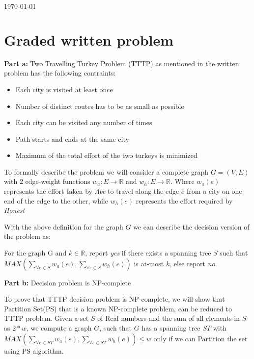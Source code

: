 \documentclass[8pt]{article}
\begin{document}
\hfill \small{\today} \\
\setlength{\fboxrule}{.5mm}\setlength{\fboxsep}{1.2mm}
\newlength{\boxlength}\setlength{\boxlength}{\textwidth}
\addtolength{\boxlength}{-4mm}
\begin{center}\end{center}
\vspace{5mm}

\section{Graded written problem}

\textbf{Part a:} Two Travelling Turkey Problem (TTTP) as mentioned in the written problem has the following contraints:
\begin{itemize}
\item Each city is visited at least once
\item Number of distinct routes has to be as small as possible
\item Each city can be visited any number of times
\item Path starts and ends at the same city
\item Maximum of the total effort of the two turkeys is minimized
\end{itemize}

To formally describe the problem we will consider a complete graph $G = (V, E)$ with $2$ edge-weight functions $w_a: E \rightarrow \mathbb{R}$ and $w_h: E \rightarrow \mathbb{R}$. Where $w_a(e)$ represents the effort taken by \textit{Abe} to travel along the edge $e$ from a city on one end of the edge to the other, while $w_h(e)$ represents the effort required by \textit{Honest}

With the above definition for the graph $G$ we can describe the decision version of the problem as:

For the graph G and $k \in \mathbb{R}$, report \textit{yes} if there exists a spanning tree $S$ such that $MAX(\sum_{\forall e \in S}{w_a(e)}, \sum_{\forall e \in S}{w_h(e)})$ is at-most $k$, else report \textit{no}.

\textbf{Part b:} Decision problem is NP-complete

To prove that TTTP decision problem is NP-complete, we will show that Partition Set(PS) that is a known NP-complete problem, can be reduced to TTTP problem.
Given a set $S$ of Real numbers and the sum of all elements in $S$ as $2*w$, we compute a graph $G$, such that $G$ has a spanning tree $ST$ with $MAX(\sum_{\forall e \in ST}{w_a(e)}, \sum_{\forall e \in ST}{w_h(e)}) \leq w$ only if we can Partition the set using PS algorithm.
\end{document}

